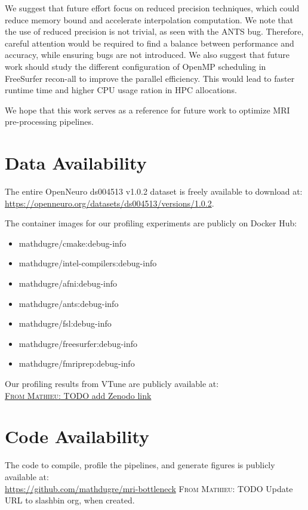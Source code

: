 \documentclass[conference]{IEEEtran}
\newcommand{\MD}[1]{\color{magenta}\textsc{From Mathieu: }#1\color{black}}
\begin{document}
We suggest that future effort focus on reduced precision techniques, which could reduce memory bound and accelerate interpolation computation. We note that the use of reduced precision is not trivial, as seen with the ANTS bug. Therefore, careful attention would be required to find a balance between performance and accuracy, while ensuring bugs are not introduced. We also suggest that future work should study the different configuration of OpenMP scheduling in FreeSurfer recon-all to improve the parallel efficiency. This would lead to faster runtime time and higher CPU usage ration in HPC allocations.

We hope that this work serves as a reference for future work to optimize MRI pre-processing pipelines. 
			
			
\section{Data Availability}
\label{sec:data-availability}
The entire OpenNeuro ds004513 v1.0.2 dataset is freely available to download at:
\\\href{https://openneuro.org/datasets/ds004513/versions/1.0.2}{https://openneuro.org/datasets/ds004513/versions/1.0.2}.
	
The container images for our profiling experiments are publicly on Docker Hub:
\begin{itemize}
	\item mathdugre/cmake:debug-info
	\item mathdugre/intel-compilers:debug-info
	\item mathdugre/afni:debug-info
	\item mathdugre/ants:debug-info
	\item mathdugre/fsl:debug-info
	\item mathdugre/freesurfer:debug-info
	\item mathdugre/fmriprep:debug-info
\end{itemize}
	
Our profiling results from VTune are publicly available at:
\\\href{URL}{\MD{TODO add Zenodo link}}
	
\section{Code Availability}
\label{sec:code-availability}
The code to compile, profile the pipelines, and generate figures is publicly available at:
\\\href{https://github.com/mathdugre/mri-bottleneck}{https://github.com/mathdugre/mri-bottleneck}
\MD{TODO Update URL to slashbin org, when created.}
													
\end{document}
